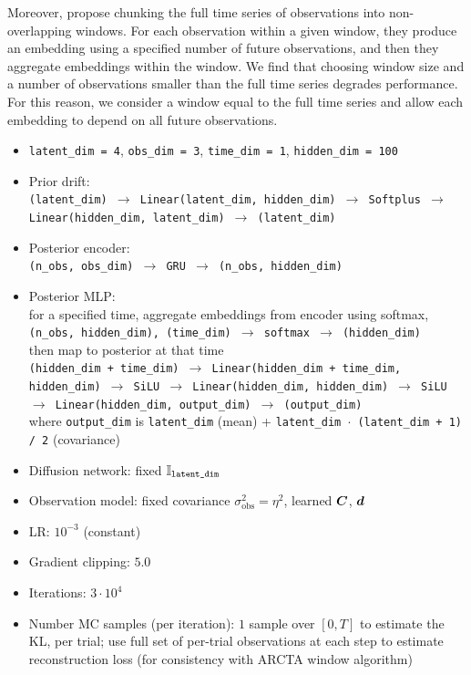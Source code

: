 \begin{itemize}
    Moreover, \citet{course2023amortized} propose chunking the full time series of observations into non-overlapping windows. For each observation within a given window, they produce an embedding using a specified number of future observations, and then they aggregate embeddings within the window. We find that choosing window size and a number of observations smaller than the full time series degrades performance. For this reason, we consider a window equal to the full time series and allow each embedding to depend on all future observations.   
   
    \begin{itemize}
        \item \texttt{latent\_dim = 4}, \texttt{obs\_dim = 3},  \texttt{time\_dim = 1}, \texttt{hidden\_dim = 100}
        \item 
        Prior drift:\\
        \texttt{(latent\_dim) $\to$ Linear(latent\_dim, hidden\_dim) $\to$ Softplus $\to$ Linear(hidden\_dim, latent\_dim) $\to$ (latent\_dim)}
        \item Posterior encoder:\\ \texttt{(n\_obs, obs\_dim) $\to$ GRU $\to$ (n\_obs, hidden\_dim)}
        \item Posterior MLP:\\ 
        for a specified time, aggregate embeddings from encoder using softmax, \\
        \texttt{(n\_obs, hidden\_dim), (time\_dim) $\to$ softmax $\to$  (hidden\_dim)}\\
        then map to posterior at that time\\
        \texttt{(hidden\_dim + time\_dim) $\to$ Linear(hidden\_dim + time\_dim, hidden\_dim) $\to$ SiLU  $\to$ Linear(hidden\_dim, hidden\_dim) $\to$ SiLU $\to$ Linear(hidden\_dim, output\_dim) $\to$ (output\_dim)}\\
        where \texttt{output\_dim} is \texttt{latent\_dim} (mean) + \texttt{latent\_dim $\cdot$ (latent\_dim + 1) / 2} (covariance)
        \item Diffusion network: fixed $\mathbb{I}_{\texttt{latent\_dim}}$
        \item Observation model: fixed covariance $\sigma_{\mathrm{obs}}^2 = \eta^2$, learned $\boldsymbol{C}$, $\boldsymbol{d}$
        \item LR: $10^{-3}$ (constant)
        \item Gradient clipping: $5.0$
        \item Iterations: $3 \cdot 10^4$ 
        \item Number MC samples (per iteration): $1$ sample over $[0, T]$ to estimate the KL, per trial; use full set of per-trial observations at each step to estimate reconstruction loss (for consistency with ARCTA window algorithm)

\end{itemize}
\end{itemize}
